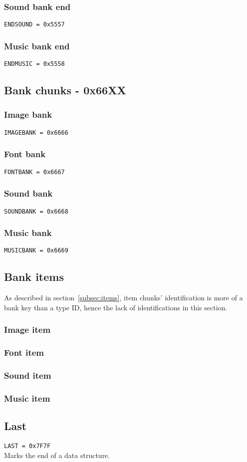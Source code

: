 \documentclass{article}
\begin{document}
\subsubsection{Sound bank end}
\verb|ENDSOUND = 0x5557|

\subsubsection{Music bank end}
\verb|ENDMUSIC = 0x5558|

\subsection{Bank chunks - 0x66XX}

\subsubsection{Image bank}
\verb|IMAGEBANK = 0x6666|

\subsubsection{Font bank}
\verb|FONTBANK = 0x6667|

\subsubsection{Sound bank}
\verb|SOUNDBANK = 0x6668|

\subsubsection{Music bank}
\verb|MUSICBANK = 0x6669|

\subsection{Bank items}

As described in section~\ref{subsec:items}, item chunks' identification is more
of a bank key than a type ID, hence the lack of identifications in this
section.

\subsubsection{Image item}

\subsubsection{Font item}

\subsubsection{Sound item}

\subsubsection{Music item}

\subsection{Last}
\verb|LAST = 0x7F7F|
\\
Marks the end of a data structure.
\end{document}
